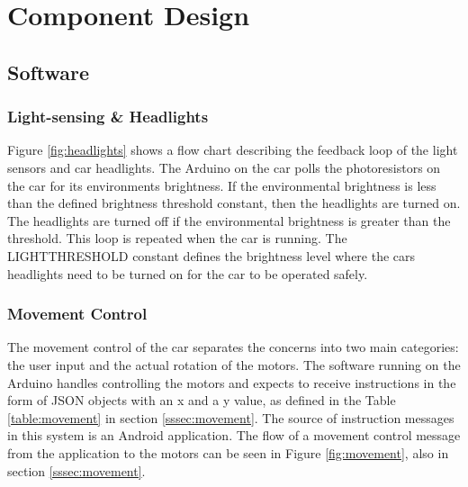 \documentclass[letterpaper,12pt]{report}
\begin{document}
    \section{Component Design}

    \subsection{Software}

    \subsubsection{Light-sensing \& Headlights}

    Figure \ref{fig:headlights} shows a flow chart describing the feedback loop
    of the light sensors and car headlights. The Arduino on the car polls the
    photoresistors on the car for its environments brightness. If the
    environmental brightness is less than the defined brightness threshold
    constant, then the headlights are turned on. The headlights are turned off
    if the environmental brightness is greater than the threshold. This loop is
    repeated when the car is running. The LIGHTTHRESHOLD constant defines the
    brightness level where the cars headlights need to be turned on for the car
    to be operated safely.

    \subsubsection{Movement Control}

    The movement control of the car separates the concerns into two main
    categories: the user input and the actual rotation of the motors. The
    software running on the Arduino handles controlling the motors and expects
    to receive instructions in the form of JSON objects with an x and a y value,
    as defined in the Table \ref{table:movement} in section
    \ref{sssec:movement}. The source of instruction messages in this system is an
    Android application. The flow of a movement control message from the
    application to the motors can be seen in Figure \ref{fig:movement}, also in
    section \ref{sssec:movement}.
\end{document}
